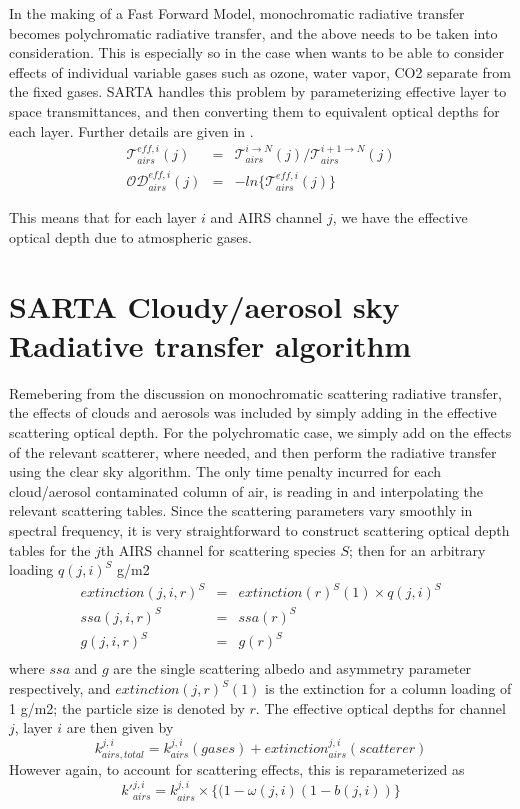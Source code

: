 \documentclass[11pt]{article}
\newcommand{\sa}{\textsf{SARTA}\xspace}
\begin{document}
In the making of a Fast Forward Model, monochromatic radiative transfer becomes polychromatic radiative transfer, and 
the above needs to be taken into consideration. This is especially so in the case when wants to be able to consider 
effects of individual variable gases such as ozone, water vapor, CO2 separate from the fixed gases. \sa handles this 
problem by parameterizing effective layer to space transmittances, and then converting 
them to equivalent optical depths for each layer. Further details are given in \cite{han:02*1,str:02*2}.
\begin{eqnarray*}
\mathcal{T}^{eff,i}_{airs}(j) & = & \mathcal{T}_{airs}^{i \rightarrow N}(j) / \mathcal{T}_{airs}^{i+1 \rightarrow N}(j) \\
\mathcal{OD}^{eff,i}_{airs}(j) & = & -ln\{\mathcal{T}^{eff,i}_{airs}(j) \}
\end{eqnarray*}

This means that for each layer $i$ and AIRS channel $j$, we have the effective optical depth due to atmospheric gases. 

\section{SARTA Cloudy/aerosol sky Radiative transfer algorithm}

Remebering from 
the discussion on monochromatic scattering radiative transfer, the effects of clouds and aerosols was included by simply 
adding in the effective scattering optical depth. For the polychromatic case, we simply add on the effects of the 
relevant scatterer, where needed, and then perform the radiative transfer using the clear sky algorithm. The only time 
penalty incurred for each cloud/aerosol contaminated column of air, is reading in and interpolating the relevant 
scattering tables. Since the scattering parameters vary smoothly in spectral frequency, it is very straightforward to 
construct scattering optical depth tables for the $j$th AIRS channel for scattering species $S$; then for an arbitrary 
loading $q(j,i)^{S}$ g/m2
 \begin{eqnarray*}
  extinction(j,i,r)^{S} & = &  extinction(r)^{S}(1) \times  q(j,i)^{S} \\
  ssa(j,i,r)^{S} & = &  ssa(r)^{S} \\
  g(j,i,r)^{S} & = &  g(r)^{S} \\
\end{eqnarray*}
where $ssa$ and $g$ are the single scattering albedo and asymmetry parameter respectively, and $extinction(j,r)^{S}(1)$ 
is the extinction for a column loading of 1 g/m2; the particle size is denoted by $r$. The effective optical depths for 
channel $j$, layer $i$ are then given by
\[
   k_{airs,total}^{j,i} = k_{airs}^{j,i}(gases) + extinction_{airs}^{j,i}(scatterer)
\]
However again, to account for scattering effects, this is reparameterized as
\[
k\prime_{airs}^{j,i} = k_{airs}^{j,i} \times \{ (1-\omega(j,i) (1-b(j,i)) \}
\]
\end{document}
